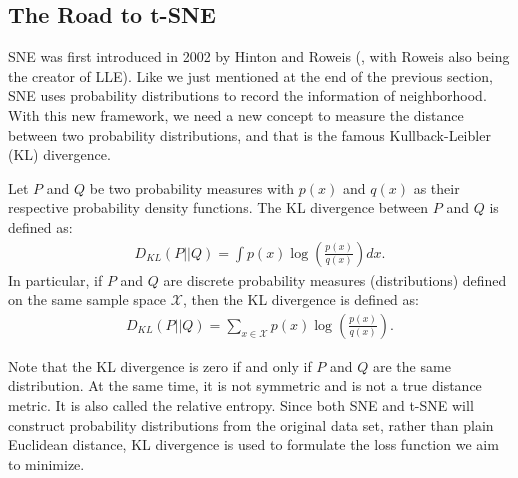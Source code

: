 \subsection{The Road to t-SNE} \label{intro_chap:sec:tsne:preintro}
SNE was first introduced in 2002 by Hinton and Roweis
(\cite{NIPS2002_6150ccc6}, with Roweis also being the creator of LLE). Like we
just mentioned at the end of the previous section, SNE uses probability
distributions to record the information of neighborhood. With this new
framework, we need a new concept to measure the distance between two
probability distributions, and that is the famous Kullback-Leibler (KL)
divergence.
\begin{definition} \label{def:KL_divergence}
    Let $P$ and $Q$ be two probability measures with $p(x)$ and $q(x)$ as their respective probability density functions. The KL divergence between $P$ and $Q$ is defined as:
    \begin{align}
        D_{KL}(P||Q) = \int p(x) \log\left(\frac{p(x)}{q(x)}\right) dx.
    \end{align}
    In particular, if $P$ and $Q$ are discrete probability measures (distributions) defined on the same sample space $\mathcal{X}$, then the KL divergence is defined as:
    \begin{align}
        D_{KL}(P||Q) = \sum_{x \in \mathcal{X}} p(x) \log\left(\frac{p(x)}{q(x)}\right).
    \end{align}
\end{definition}
Note that the KL divergence is zero if and only if $P$ and $Q$ are the same distribution. At the same time, it is not symmetric and is not a true distance metric. It is also called the relative entropy. Since both SNE and t-SNE will construct probability distributions from the original data set, rather than plain Euclidean distance, KL divergence is used to formulate the loss function we aim to minimize.

